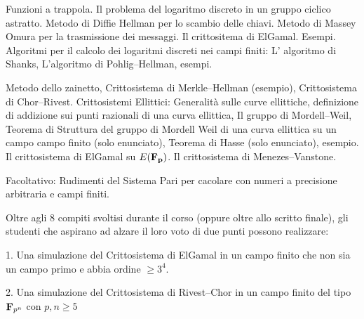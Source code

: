 Funzioni a trappola. Il problema del logaritmo discreto in un gruppo 
ciclico astratto. Metodo di Diffie Hellman per lo scambio delle
chiavi. Metodo di Massey Omura per la trasmissione dei messaggi.
Il crittositema di ElGamal. Esempi. Algoritmi per il calcolo dei 
logaritmi discreti nei campi finiti: L' algoritmo di Shanks, L'algoritmo di
Pohlig--Hellman, esempi.


Metodo dello zainetto, Crittosistema di Merkle--Hellman (esempio), Crittosistema di Chor--Rivest. 
Crittosistemi Ellittici: Generalit\`{a} sulle curve ellittiche,
definizione di addizione sui punti razionali di una curva ellittica, Il gruppo di Mordell--Weil,
Teorema di Struttura del gruppo di Mordell Weil di una curva ellittica su un campo campo finito
(solo enunciato), Teorema di Hasse (solo enunciato), esempio. Il crittosistema di ElGamal su
$E(\bf{F}_p)$. Il crittosistema di Menezes--Vanstone.


 Facoltativo: Rudimenti del Sistema Pari per cacolare con numeri
a precisione arbitraria e campi finiti.\bigskip

\testi  

\bib
{} 
\endbib

\bib                                             
{}
\endbib

\bib
{}
\endbib

\bib
{}
\par \hskip 6mm
\endbib

%
% 

%

\esami 

Oltre agli 8 compiti svoltisi durante il corso (oppure oltre allo scritto 
finale), gli studenti che aspirano ad alzare il loro voto di due punti
possono realizzare:
\item{1.} Una simulazione del Crittosistema di ElGamal in un campo finito che
non sia un campo primo e abbia ordine $\geq 3^4$.
\item{2.} Una simulazione del Crittosistema di Rivest--Chor in un campo finito
del tipo ${\bf F}_{p^n}$ con $p, n\geq 5$
\bye 

